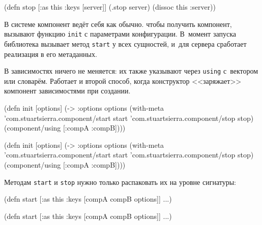 \begin{english}
  \begin{clojure}
(defn stop
  [{:as this :keys [server]}]
  (.stop server)
  (dissoc this :server))
  \end{clojure}
\end{english}

В системе компонент ведёт себя как обычно. чтобы получить компонент, вызывают
функцию \verb|init| с параметрами конфигурации. В~момент запуска библиотека
вызывает метод \verb|start| у всех сущностей, и~для сервера сработает реализация
в его метаданных.

В зависимостях ничего не меняется: их также указывают через \verb|using|
с~вектором или словарём. Работает и второй способ, когда конструктор
<<заряжает>> компонент зависимостями при создании.

\ifx\DEVICETYPE\MOBILE

\begin{english}
  \begin{clojure}
(defn init [options]
  (->
    {:options options}
    (with-meta
     {'com.stuartsierra.component/start
      start
      'com.stuartsierra.component/stop
      stop})
    (component/using [:compA :compB])))
  \end{clojure}
\end{english}

\else

\begin{english}
  \begin{clojure}
(defn init [options]
  (-> {:options options}
      (with-meta
        {'com.stuartsierra.component/start start
         'com.stuartsierra.component/stop stop})
      (component/using [:compA :compB])))
  \end{clojure}
\end{english}

\fi

\noindent
Методам \verb|start| и \verb|stop| нужно только распаковать их на уровне
сигнатуры:

\ifx\DEVICETYPE\MOBILE

\begin{english}
  \begin{clojure}
(defn start
  [{:as this
    :keys [compA compB options]}]
  ...)
  \end{clojure}
\end{english}

\else

\begin{english}
  \begin{clojure}
(defn start
  [{:as this :keys [compA compB options]}]
  ...)
  \end{clojure}
\end{english}

